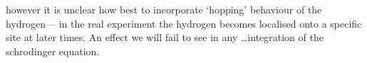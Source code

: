 however
it is unclear how best to
incorporate `hopping' behaviour
of the hydrogen--- in the real
experiment the hydrogen becomes
localised onto a specific site
at later times. An effect we will
fail to see in any \ldots integration of
the schrodinger equation.

